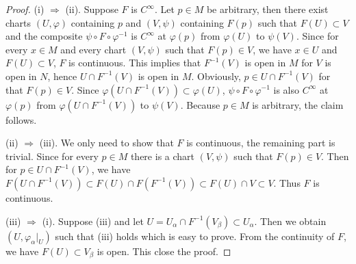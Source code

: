 \begin{proof}
    (i) $\Rightarrow$ (ii). Suppose $F$ is $C^\infty$. Let $p \in M$ be arbitrary, then there exist charts $(U, \varphi)$ containing $p$ and $(V, \psi)$ containing $F(p)$ such that $F(U) \subset V$ and the composite $\psi \circ F \circ \varphi^{-1}$ is $C^\infty$ at $\varphi(p)$ from $\varphi(U)$ to $\psi(V)$. Since for every $x \in M$ and every chart $(V, \psi)$ such that $F(p) \in V$, we have $x \in U$ and $F(U) \subset V$, $F$ is continuous. This implies that $F^{-1}(V)$ is open in $M$ for $V$ is open in $N$, hence $U \cap F^{-1}(V)$ is open in $M$. Obviously, $p \in U \cap F^{-1}(V)$ for that $F(p) \in V$. Since $\varphi(U \cap F^{-1}(V)) \subset \varphi(U)$, $\psi \circ F \circ \varphi^{-1}$ is also $C^\infty$ at $\varphi(p)$ from $\varphi(U \cap F^{-1}(V))$ to $\psi(V)$. Because $p \in M$ is arbitrary, the claim follows.

    (ii) $\Rightarrow$ (iii).  We only need to show that $F$ is continuous, the remaining part is trivial. Since for every $p \in M$ there is a chart $(V, \psi)$ such that $F(p) \in V$. Then for $p \in U \cap F^{-1}(V)$, we have $F(U \cap F^{-1}(V)) \subset F(U) \cap F(F^{-1}(V)) \subset F(U) \cap V \subset V$. Thus $F$ is continuous. 

    (iii) $\Rightarrow$ (i). Suppose (iii) and let $U = U_\alpha \cap F^{-1}(V_\beta) \subset U_\alpha$. Then we obtain $(U, \varphi_\alpha|_U)$ such that (iii) holds which is easy to prove. From the continuity of $F$, we have $F(U) \subset V_\beta$ is open. This close the proof.
    \begin{comment}
    (ii) $\Rightarrow$ (iv). Let $(\widetilde{U}, \widetilde{\varphi})$ and $(\widetilde{V}, \widetilde{\psi})$ be any charts on $M$ and $N$, respectively, such that $\widetilde{U} \cap F^{-1}(\widetilde{V}) \neq \emptyset$. If $p \in \widetilde{U} \cap F^{-1}(\widetilde{V})$. by assumption, there are charts $(U, \varphi)$ containing $p$ and $(V, \psi)$ containing $F(p)$ such that  $\psi \circ F \circ \varphi^{-1}$ is $C^\infty$ from $\varphi(U \cap F^{-1}(V))$ to $\psi(V)$. By the $C^\infty$-compatibility of charts in a differentiable structure, $\varphi \circ \widetilde{\varphi}^{-1} : \widetilde{\varphi}(U \cap \widetilde{U}) \to \varphi(U \cap \widetilde{U})$ and $\widetilde{\psi} \circ \psi^{-1} : \psi(V \cap \widetilde{V}) \to \widetilde{\psi}(V \cap \widetilde{V})$ are $C^\infty$. Thus,
    \begin{align*}
        \widetilde{\psi} \circ F \circ \widetilde{\varphi}^{-1}
        = (\widetilde{\psi} \circ \psi^{-1}) \circ
        (\psi \circ F \circ \varphi^{-1}) \circ
        (\varphi \circ \widetilde{\varphi}^{-1})
    \end{align*}
    is $C^\infty$ at $\widetilde{\varphi}(p)$. Since $p \in \widetilde{U} \cap F^{-1}(\widetilde{V})$ is arbitrary, so does $\widetilde{\varphi}(p) \in \widetilde{\varphi}(\widetilde{U} \cap F^{-1}(\widetilde{V}))$, we have $\widetilde{\psi} \circ F \circ \widetilde{\varphi}^{-1}$ is $C^\infty$ from $\widetilde{\varphi}(\widetilde{U} \cap F^{-1}(\widetilde{V}))$ to $\widetilde{\psi}(\widetilde{V})$.
    \end{comment}
\end{proof}

